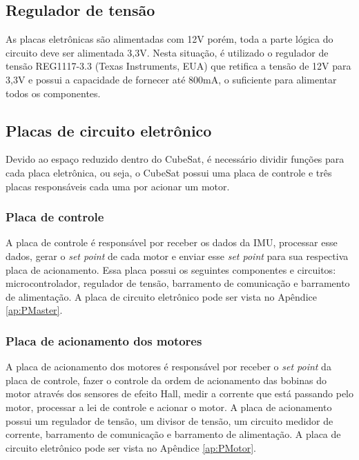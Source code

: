 \documentclass[
	12pt,				%
	openany,			%
	twoside,			%
	a4paper,			%
	english,			%
	french,				%
	spanish,			%
	brazil,				%
	oldfontcommands
	]{abntex2}
\begin{document}
\subsection{Regulador de tensão}

As placas eletrônicas são alimentadas com 12V porém, toda a parte lógica do circuito deve ser alimentada 3,3V. Nesta situação, é utilizado o regulador de tensão REG1117-3.3 (Texas Instruments, EUA) que retifica a tensão de 12V para 3,3V e possui a capacidade de fornecer até 800mA, o suficiente para alimentar todos os componentes.

\subsection{Placas de circuito eletrônico}

Devido ao espaço reduzido dentro do CubeSat, é necessário dividir funções para cada placa eletrônica, ou seja, o CubeSat possui uma placa de controle e três placas responsáveis cada uma por acionar um motor.

\subsubsection{Placa de controle}

A placa de controle é responsável por receber os dados da IMU, processar esse dados, gerar o \textit{set point} de cada motor e enviar esse \textit{set point} para sua respectiva placa de acionamento. Essa placa possui os seguintes componentes e circuitos: microcontrolador, regulador de tensão, barramento de comunicação e barramento de alimentação. A placa de circuito eletrônico pode ser vista no Apêndice \ref{ap:PMaster}. 

\subsubsection{Placa de acionamento dos motores}

A placa de acionamento dos motores é responsável por receber o \textit{set point} da placa de controle, fazer o controle da ordem de acionamento das bobinas do motor através dos sensores de efeito Hall, medir a corrente que está passando pelo motor, processar a lei de controle e acionar o motor. A placa de acionamento possui um regulador de tensão, um divisor de tensão, um circuito medidor de corrente, barramento de comunicação e barramento de alimentação.  A placa de circuito eletrônico pode ser vista no Apêndice \ref{ap:PMotor}.
\end{document}
